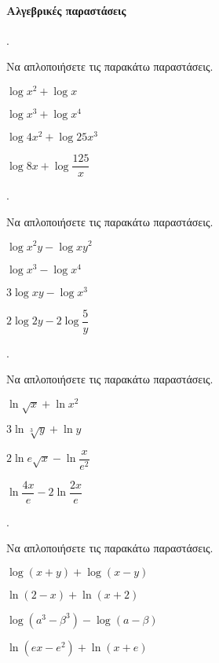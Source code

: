 \documentclass[11pt,a4paper,twocolumn]{article}
\newcounter{askhsh}
\newcommand{\askhsh}{\large\theaskhsh.\ \addtocounter{askhsh}{1}}
\begin{document}
\paragraph{Αλγεβρικές παραστάσεις}
\askhsh Να απλοποιήσετε τις παρακάτω παραστάσεις.
\begin{multicols}{2}
\begin{alist}
\item $ \log{x^2}+\log{x} $
\item $ \log{x^3}+\log{x^4} $
\item $ \log{4x^2}+\log{25x^3} $
\item $ \log{8x}+\log{\dfrac{125}{x}} $
\end{alist}
\end{multicols}
\askhsh Να απλοποιήσετε τις παρακάτω παραστάσεις.
\begin{multicols}{2}
\begin{alist}
\item $ \log{x^2y}-\log{xy^2} $
\item $ \log{x^3}-\log{x^4} $
\item $ 3\log{xy}-\log{x^3} $
\item $ 2\log{2y}-2\log{\dfrac{5}{y}} $
\end{alist}
\end{multicols}
\askhsh Να απλοποιήσετε τις παρακάτω παραστάσεις.
\begin{multicols}{2}
\begin{alist}
\item $ \ln{\sqrt{x}}+\ln{x^2} $
\item $ 3\ln{\sqrt[3]{y}}+\ln{y} $
\item $ 2\ln{e\sqrt{x}}-\ln{\dfrac{x}{e^2}} $
\item $ \ln{\dfrac{4x}{e}}-2\ln{\dfrac{2x}{e}} $
\end{alist}
\end{multicols}
\askhsh Να απλοποιήσετε τις παρακάτω παραστάσεις.
\begin{alist}
\item $ \log{(x+y)}+\log{(x-y)} $
\item $ \ln{(2-x)}+\ln{(x+2)} $
\item $ \log{\left( a^3-\beta^3\right) }-\log{(a-\beta)} $
\item $ \ln{(ex-e^2)}+\ln{(x+e)} $
\end{alist}
\end{document}
